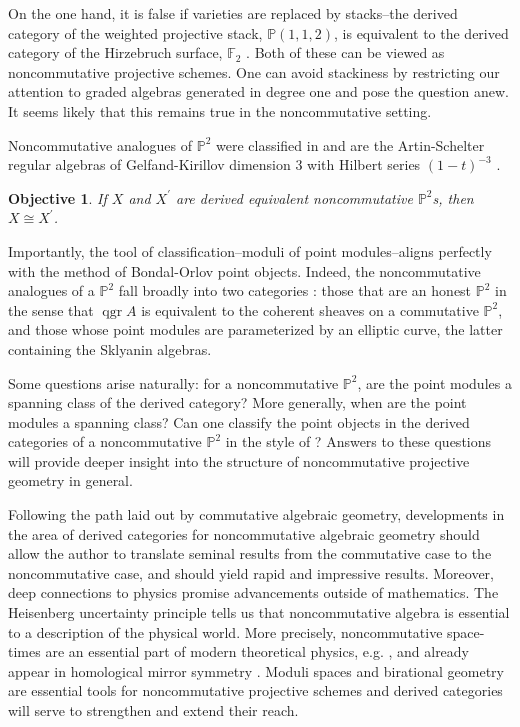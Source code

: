 \documentclass[12pt]{amsart}
\newtheorem{objective}{Objective}
\theoremstyle{definition}
\begin{document}
On the one hand, it is false if varieties are replaced by stacks--the derived category of the weighted projective stack, $\mathbb{P}(1,1,2)$, is equivalent to the derived category of the Hirzebruch surface, $\mathbb{F}_2$ \cite{BF12}.
Both of these can be viewed as noncommutative projective schemes.
One can avoid stackiness by restricting our attention to graded algebras generated in degree one and pose the question anew.
It seems likely that this remains true in the noncommutative setting.

Noncommutative analogues of $\mathbb{P}^2$ were classified in \cite{ATV,Stephenson96,Stephenson97} and are the Artin-Schelter regular algebras \cite{AS87} of Gelfand-Kirillov dimension 3 with Hilbert series $(1-t)^{-3}$ \cite[Section 11]{SVdB01}.
\begin{tcolorbox}\begin{objective}
    If $X$ and $X^\prime$ are derived equivalent noncommutative $\mathbb{P}^2$s, then $X \cong X^\prime$.
  \end{objective}
\end{tcolorbox}

Importantly, the tool of classification--moduli of point modules--aligns perfectly with the method of Bondal-Orlov point objects.
Indeed, the noncommutative analogues of a $\mathbb{P}^2$ fall broadly into two categories \cite{Stafford02}: those that are an honest $\mathbb{P}^2$ in the sense that $\operatorname{qgr} A$ is equivalent to the coherent sheaves on a commutative $\mathbb{P}^2$, and those whose point modules are parameterized by an elliptic curve, the latter containing the Sklyanin algebras.

Some questions arise naturally: for a noncommutative $\mathbb{P}^2$, are the point modules a spanning class of the derived category?
More generally, when are the point modules a spanning class?
Can one classify the point objects in the derived categories of a noncommutative $\mathbb{P}^2$ in the style of \cite{Bondal-Orlov}?
Answers to these questions will provide deeper insight into the structure of noncommutative projective geometry in general.

Following the path laid out by commutative algebraic geometry, developments in the area of derived categories for noncommutative algebraic geometry should allow the author to translate seminal results from the commutative case to the noncommutative case, and should yield rapid and impressive results.
Moreover, deep connections to physics promise advancements outside of mathematics.
The Heisenberg uncertainty principle tells us that noncommutative algebra is essential to a description of the physical world.
More precisely, noncommutative space-times are an essential part of modern theoretical physics, e.g. \cite{DoNe01}, and already appear in homological mirror symmetry \cite{AKO08}.
Moduli spaces and birational geometry are essential tools for noncommutative projective schemes and derived categories will serve to strengthen and extend their reach.



\end{document}
